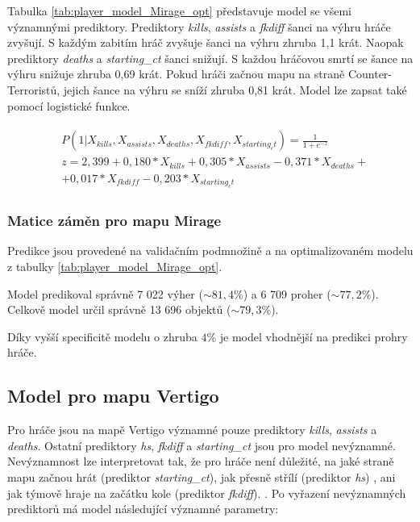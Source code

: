 

{\color{red}
Tabulka \ref{tab:player_model_Mirage_opt} představuje model se všemi významnými prediktory. Prediktory \textit{kills}, \textit{assists} a \textit{fkdiff} šanci na výhru
hráče zvyšují. S každým zabitím hráč zvyšuje šanci na výhru zhruba 1,1 krát. Naopak prediktory \textit{deaths} a \textit{starting\_ct} šanci snižují. S každou hráčovou smrtí
se šance na výhru snižuje zhruba 0,69 krát. Pokud hráči začnou mapu na straně Counter-Terroristů, jejich šance na výhru se sníží zhruba 0,81 krát. 
Model lze zapsat také pomocí logistické funkce.
}

\begin{align}
    \begin{split}
        &P(1 | X_{kills}, X_{assists}, X_{deaths}, X_{fkdiff}, X_{starting_ct}) = \frac{1}{1 + e^{-z}} \\
        &z = 2,399 + 0,180*X_{kills} + 0,305*X_{assists} - 0,371*X_{deaths} + \\
        &+ 0,017*X_{fkdiff} - 0,203*X_{starting_ct}
    \end{split}
    \label{eq:player_funkce_Mirage}
\end{align}

\subsubsection{Matice záměn pro mapu Mirage}
Predikce jsou provedené na validačním podmnožině a na optimalizovaném modelu z tabulky \ref{tab:player_model_Mirage_opt}.



Model predikoval správně 7 022 výher 
{\color{red}
($\sim 81,4\%$)
}
a 6 709 proher
{\color{red}
($\sim 77,2\%$). Celkově model určil správně 13 696 objektů ($\sim 79,3\%$).
}



{\color{red}
Díky vyšší specificitě modelu o zhruba $4\%$ je model vhodnější na predikci prohry hráče.
}

\subsection{Model pro mapu Vertigo}



Pro hráče jsou na mapě Vertigo významné pouze prediktory \textit{kills}, \textit{assists} a \textit{deaths}. Ostatní prediktory \textit{hs}, \textit{fkdiff} a \textit{starting\_ct}
jsou pro model nevýznamné. Nevýznamnost lze interpretovat tak, že pro hráče není důležité, na jaké straně mapu začnou hrát (prediktor  \textit{starting\_ct}), jak přesně
střílí (prediktor \textit{hs})
{\color{red}
, ani jak týmově hraje na začátku kole (prediktor \textit{fkdiff}).
}.
Po vyřazení nevýznamných prediktorů má model následující významné parametry:

